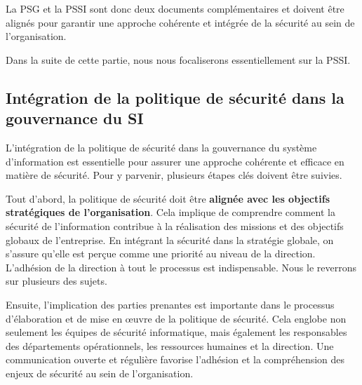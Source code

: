La PSG et la PSSI sont donc deux documents complémentaires et doivent être alignés pour garantir une approche cohérente et intégrée de la sécurité au sein de l'organisation.

Dans la suite de cette partie, nous nous focaliserons essentiellement sur la PSSI.


\subsection{Intégration de la politique de sécurité dans la gouvernance du SI}

L'intégration de la politique de sécurité dans la gouvernance du système d'information est essentielle pour assurer une approche cohérente et efficace en matière de sécurité. Pour y parvenir, plusieurs étapes clés doivent être suivies.

Tout d'abord, la politique de sécurité doit être \textbf{alignée avec les objectifs stratégiques de l'organisation}. Cela implique de comprendre comment la sécurité de l'information contribue à la réalisation des missions et des objectifs globaux de l'entreprise. En intégrant la sécurité dans la stratégie globale, on s'assure qu'elle est perçue comme une priorité au niveau de la direction. L'adhésion de la direction à tout le processus est indispensable. Nous le reverrons sur plusieurs des sujets.

Ensuite, l'implication des parties prenantes est importante dans le processus d'élaboration et de mise en œuvre de la politique de sécurité. Cela englobe non seulement les équipes de sécurité informatique, mais également les responsables des départements opérationnels, les ressources humaines et la direction. Une communication ouverte et régulière favorise l'adhésion et la compréhension des enjeux de sécurité au sein de l'organisation.

